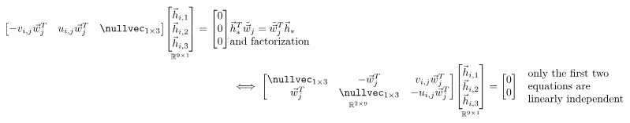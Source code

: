 \begin{description}
\begin{description}
\begin{align*}
{\begin{bmatrix}
                            -v_{i,j} \vec{w}_j^T & u_{i,j} \vec{w}_j^T & \nullvec_{1\times 3}
                        \end{bmatrix}}
                        \underset{\mathbb{R}^{9 \times 1}}{\begin{bmatrix}
                            \vec{h}_{i,1} \\ \vec{h}_{i,2} \\ \vec{h}_{i,3}
                        \end{bmatrix}}
                        =
                        \begin{bmatrix} 0 \\ 0 \\ 0 \end{bmatrix} 
                    & \text{\parbox[t]{5cm}{$\vec{h}_{*}^T \tilde{\vec{w}}_j = \tilde{\vec{w}}_j^T \vec{h}_{*}$\\and factorization}} \\
                    &\iff
                        \underset{\mathbb{R}^{2 \times 9}}{\begin{bmatrix}
                            \nullvec_{1\times 3} & -\vec{w}_j^T & v_{i,j}\vec{w}_j^T \\
                            \vec{w}_j^T & \nullvec_{1\times 3} & -u_{i,j} \vec{w}_j^T \\
                        \end{bmatrix}}
                        \underset{\mathbb{R}^{9 \times 1}}{\begin{bmatrix}
                            \vec{h}_{i,1} \\ \vec{h}_{i,2} \\ \vec{h}_{i,3}
                        \end{bmatrix}}
                        =
                        \begin{bmatrix} 0 \\ 0 \end{bmatrix} 
                    & \text{\parbox{5cm}{only the first two\\equations are\\linearly independent}} \\
                \end{align*}
        \end{description}

    \item[Homographies refinement]
    \item[Initial intrinsic parameters guess]
    \item[Initial extrinsic parameters guess]
    \item[Initial distortion parameters guess]
    \item[Parameters refinement]
\end{description}
